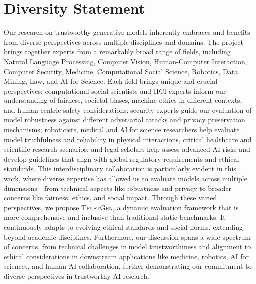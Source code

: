 \section*{Diversity Statement}
Our research on trustworthy generative models inherently embraces and benefits from diverse perspectives across multiple disciplines and domains. The project brings together experts from a remarkably broad range of fields, including Natural Language Processing, Computer Vision, Human-Computer Interaction, Computer Security, Medicine, Computational Social Science, Robotics, Data Mining, Law, and AI for Science. Each field brings unique and crucial perspectives: computational social scientists and HCI experts inform our understanding of fairness, societal biases, machine ethics in different contexts, and human-centric safety considerations; security experts guide our evaluation of model robustness against different adversarial attacks and privacy preservation mechanisms; roboticists, medical and AI for science researchers help evaluate model truthfulness and reliability in physical interactions, critical healthcare and scientific research scenarios; and legal scholars help assess advanced AI risks and develop guidelines that align with global regulatory requirements and ethical standards. 
This interdisciplinary collaboration is particularly evident in this work, where diverse expertise has allowed us to evaluate models across multiple dimensions - from technical aspects like robustness and privacy to broader concerns like fairness, ethics, and social impact. 
Through these varied perspectives, we propose \textsc{TrustGen}, a dynamic evaluation framework that is more comprehensive and inclusive than traditional static benchmarks. 
It continuously adapts to evolving ethical standards and social norms, extending beyond academic disciplines.
Furthermore, our discussion spans a wide spectrum of concerns, from technical challenges in model trustworthiness and alignment to ethical considerations in downstream applications like medicine, robotics, AI for sciences, and human-AI collaboration, further demonstrating our commitment to diverse perspectives in trustworthy AI research.






